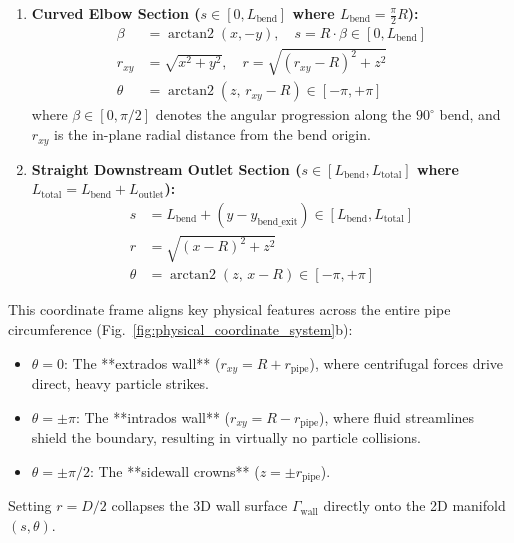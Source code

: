 \documentclass{article}
\begin{document}
\begin{enumerate}
    \item \textbf{Curved Elbow Section ($s \in [0, L_{\text{bend}}]$ where $L_{\text{bend}} = \frac{\pi}{2} R$):}
    \begin{align}
        \beta &= \operatorname{arctan2}(x, -y), \quad s = R \cdot \beta \in [0, L_{\text{bend}}] \label{eq:curv_bend_s} \\
        r_{xy} &= \sqrt{x^2 + y^2}, \quad r = \sqrt{(r_{xy} - R)^2 + z^2} \label{eq:curv_bend_r} \\
        \theta &= \operatorname{arctan2}(z, \, r_{xy} - R) \in [-\pi, +\pi] \label{eq:curv_bend_theta}
    \end{align}
    where $\beta \in [0, \pi/2]$ denotes the angular progression along the $90^\circ$ bend, and $r_{xy}$ is the in-plane radial distance from the bend origin.
    
    \item \textbf{Straight Downstream Outlet Section ($s \in [L_{\text{bend}}, L_{\text{total}}]$ where $L_{\text{total}} = L_{\text{bend}} + L_{\text{outlet}}$):}
    \begin{align}
        s &= L_{\text{bend}} + (y - y_{\text{bend\_exit}}) \in [L_{\text{bend}}, L_{\text{total}}] \label{eq:curv_out_s} \\
        r &= \sqrt{(x - R)^2 + z^2} \label{eq:curv_out_r} \\
        \theta &= \operatorname{arctan2}(z, \, x - R) \in [-\pi, +\pi] \label{eq:curv_out_theta}
    \end{align}
\end{enumerate}

This coordinate frame aligns key physical features across the entire pipe circumference (Fig.~\ref{fig:physical_coordinate_system}b):
\begin{itemize}
    \item $\theta = 0$: The **extrados wall** ($r_{xy} = R + r_{\text{pipe}}$), where centrifugal forces drive direct, heavy particle strikes.
    \item $\theta = \pm\pi$: The **intrados wall** ($r_{xy} = R - r_{\text{pipe}}$), where fluid streamlines shield the boundary, resulting in virtually no particle collisions.
    \item $\theta = \pm\pi/2$: The **sidewall crowns** ($z = \pm r_{\text{pipe}}$).
\end{itemize}
Setting $r = D/2$ collapses the 3D wall surface $\Gamma_{\text{wall}}$ directly onto the 2D manifold $(s, \theta)$.
\end{document}
